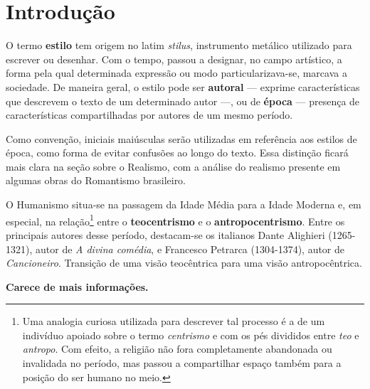 
\chapter{Introdução}


O termo \textbf{estilo} tem origem no latim \textit{stilus}, instrumento metálico utilizado para escrever ou desenhar. Com o tempo, passou a designar, no campo artístico, a forma pela qual determinada expressão ou modo particularizava-se, marcava a sociedade. De maneira geral, o estilo pode ser \textbf{autoral} — exprime características que descrevem o texto de um determinado autor —, ou de \textbf{época} — presença de características compartilhadas por autores de um mesmo período. 

Como convenção, iniciais maiúsculas serão utilizadas em referência aos estilos de época, como forma de evitar confusões ao longo do texto. Essa distinção ficará mais clara na seção sobre o Realismo, com a análise do realismo presente em algumas obras do Romantismo brasileiro.

O Humanismo situa-se na passagem da Idade Média para a Idade Moderna e, em especial, na relação\footnote{Uma analogia curiosa utilizada para descrever tal processo é a de um indivíduo apoiado sobre o termo \textit{centrismo} e com os pés divididos entre \textit{teo} e \textit{antropo}. Com efeito, a religião não fora completamente abandonada ou invalidada no período, mas passou a compartilhar espaço também para a posição do ser humano no meio.} entre o \textbf{teocentrismo} e o \textbf{antropocentrismo}. Entre os principais autores desse período, destacam-se os italianos Dante Alighieri (1265-1321), autor de \textit{A divina comédia}, e Francesco Petrarca (1304-1374), autor de \textit{Cancioneiro}. Transição de uma visão teocêntrica para uma visão antropocêntrica.

		
\textbf{Carece de mais informações.}